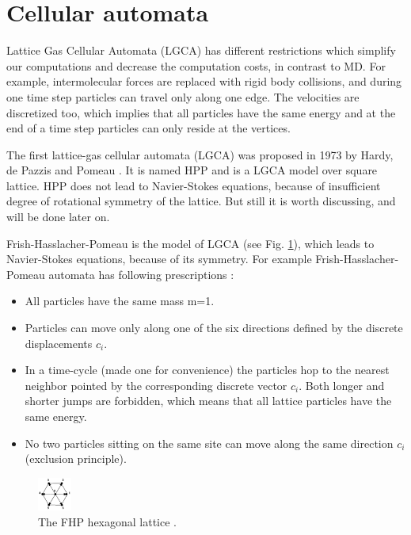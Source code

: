 
\section{Cellular automata}
Lattice Gas Cellular Automata (LGCA) has different restrictions which simplify our computations and decrease the computation costs, in contrast to MD. For example, intermolecular forces are replaced with rigid body collisions, and during one time step particles can travel only along one edge. The velocities are discretized too, which implies that all particles have the same energy and at the end of a time step particles can only reside at the vertices.

The first lattice-gas cellular automata (LGCA) was proposed in 1973 by Hardy, de Pazzis and Pomeau \cite{wolfgladrow}. It is named HPP and is a LGCA model over square lattice. HPP does not lead to Navier-Stokes equations, because of insufficient degree of rotational symmetry of the lattice. But still it is worth  discussing, and  will be done later on.

Frish-Hasslacher-Pomeau is the model of LGCA (see Fig. \ref{fig:fhp-lattice}), which leads to Navier-Stokes equations, because of its symmetry. For example Frish-Hasslacher-Pomeau automata has following prescriptions \cite{succi}:


\begin{itemize}
\item All particles have the same mass m=1.
\item Particles can move only along one of the six directions defined by the discrete displacements $c_{i}$.
\item In a time-cycle (made one for convenience) the particles hop to the nearest neighbor pointed by the corresponding discrete vector $c_i$. Both longer and shorter jumps are forbidden, which means that all lattice particles have the same energy.
\item No two particles sitting on the same site can move along the same direction $c_{i}$ (exclusion principle).
\end{itemize}

\begin{figure}[H]
  \centering
  \includegraphics[width=0.1\textwidth]{img/fig1.png}
  \caption{The FHP hexagonal lattice \cite{succi}.}\label{fig:fhp-lattice}
\end{figure}

